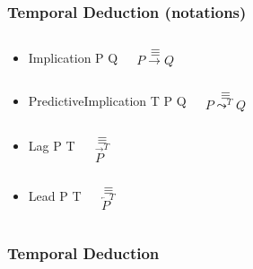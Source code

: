 \documentclass[aspectratio=169]{beamer}
\begin{document}
\begin{frame}[fragile]
  \frametitle{Temporal Deduction \alert{(notations)}}
  \begin{itemize}
  \item<+->
  \begin{columns}
    \column{1in}
\begin{semiverbatim}
Implication
  P
  Q
\end{semiverbatim}
    \column{0.5in}
    $$\equiv$$
    \column{1in}
    $$P \rightarrow Q$$
  \end{columns}
  \item<+->
  \begin{columns}
    \column{1in}
\begin{semiverbatim}
PredictiveImplication
  T
  P
  Q
\end{semiverbatim}
    \column{0.5in}
    $$\equiv$$
    \column{1in}
    $$P \leadsto^T Q$$
  \end{columns}

  \item<+->
  \begin{columns}
    \column{1in}
\begin{semiverbatim}
Lag
  P
  T
\end{semiverbatim}
    \column{0.5in}
    $$\equiv$$
    \column{1in}
    $$\overrightarrow{P}^T$$
  \end{columns}

  \item<+->
  \begin{columns}
    \column{1in}
\begin{semiverbatim}
Lead
  P
  T
\end{semiverbatim}
    \column{0.5in}
    $$\equiv$$
    \column{1in}
    $$\overleftarrow{P}^T$$
  \end{columns}

  \end{itemize}
\end{frame}

\begin{frame}
  \frametitle{Temporal Deduction}
  {\small
    \begin{prooftree}
    \end{prooftree}
  }

  \pause

    {\small
    \begin{prooftree}
    \end{prooftree}}
\end{frame}
\end{document}
